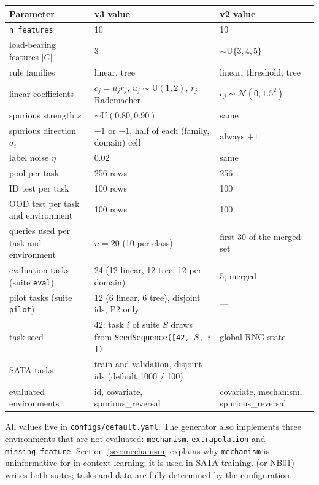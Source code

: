 \documentclass[11pt,a4paper]{article}
\newcommand{\1}{\mathbf{1}}
\theoremstyle{plain}
\theoremstyle{definition}
\theoremstyle{remark}
\begin{document}
\begin{center}
\begin{tabular}{L{5.0cm}L{6.4cm}L{4.2cm}}
\toprule
\textbf{Parameter} & \textbf{v3 value} & \textbf{v2 value} \\
\midrule
\texttt{n\_features}              & 10 & 10 \\
load-bearing features $|C|$      & 3 & $\sim \text{U}\{3,4,5\}$ \\
rule families                    & linear, tree & linear, threshold, tree \\
linear coefficients              & $c_j = u_j r_j$, $u_j \sim \text{U}(1,2)$, $r_j$ Rademacher & $c_j \sim \mathcal{N}(0, 1.5^2)$ \\
spurious strength $s$            & $\sim \text{U}(0.80, 0.90)$ & same \\
spurious direction $\sigma_t$    & $+1$ or $-1$, half of each (family, domain) cell & always $+1$ \\
label noise $\eta$               & 0.02 & same \\
pool per task                    & 256 rows & 256 \\
ID test per task                 & 100 rows & 100 \\
OOD test per task and environment & 100 rows & 100 \\
queries used per task and environment & $n = 20$ (10 per class) & first 30 of the merged set \\
evaluation tasks (suite \texttt{eval}) & 24 (12 linear, 12 tree; 12 per domain) & 5, merged \\
pilot tasks (suite \texttt{pilot}) & 12 (6 linear, 6 tree), disjoint ids; P2 only & --- \\
task seed                        & 42: task $i$ of suite $S$ draws from \texttt{SeedSequence([42, $S$, $i$])} & global RNG state \\
SATA tasks                       & train and validation, disjoint ids (default 1000 / 100) & --- \\
evaluated environments           & id, covariate, spurious\_reversal & covariate, mechanism, spurious\_reversal \\
\bottomrule
\end{tabular}
\end{center}

All values live in \texttt{configs/default.yaml}. The generator also
implements three environments that are not evaluated: \texttt{mechanism},
\texttt{extrapolation} and \texttt{missing\_feature}.
Section~\ref{sec:mechanism} explains why \texttt{mechanism} is uninformative
for in-context learning; it is used in SATA training.
 (or NB01) writes both suites; tasks and
data are fully determined by the configuration.
\end{document}
